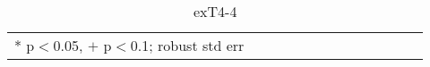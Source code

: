 \documentclass[11pt, letterpaper]{article}
\begin{document}
\begin{spacing}{1.4}













\begin{spacing}{.9} \begin{table}[H]\centering  \label{exT4-4} \begin{scriptsize} \begin{tabular}{p{1.0in}p{.5in}p{.5in}p{.5in}p{.5in}p{.5in}p{.5in}p{.5in}p{.5in}p{.5in}p{.5 in}p{.5in}p{.5 in}}\hline  \hline   * p$<$0.05, $+$ p$<$0.1; robust std err \end{tabular}\end{scriptsize}\caption{exT4-4}\end{table} \end{spacing}


\end{spacing}
\end{document}
